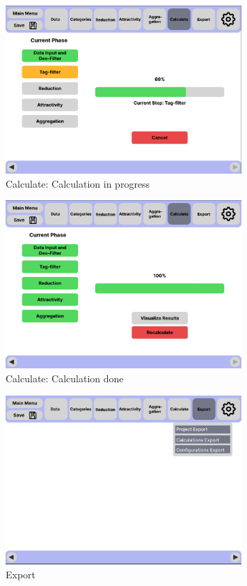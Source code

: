\documentclass[parskip=full]{scrartcl} %
\begin{document}
\begin{figure}
    \centering
    \includegraphics[width=0.8\textwidth,cfbox=black 1pt 0pt]{pictures/Calculate 2.png}
    \caption{Calculate: Calculation in progress}
\end{figure}

\begin{figure}
    \centering
    \includegraphics[width=0.8\textwidth,cfbox=black 1pt 0pt]{pictures/Calculate 3.png}
    \caption{Calculate: Calculation done}
\end{figure}

\begin{figure}
    \centering
    \includegraphics[width=0.8\textwidth,cfbox=black 1pt 0pt]{pictures/Export.png}
    \caption{Export}
\end{figure}
\end{document}
